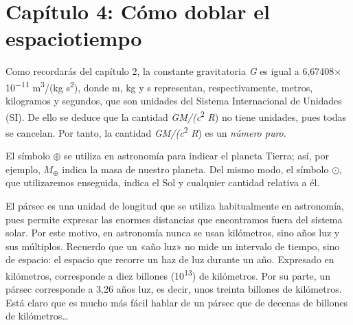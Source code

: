 \section*{Capítulo 4: Cómo doblar el espaciotiempo}
\begin{description}[style=multiline,leftmargin=2em,labelwidth=1.5em]

\item[1.]\hypertarget{note:04-01}{}Como recordarás del capítulo 2, la constante
gravitatoria \emph{G} es igual a
6,67408\(\times\)10\textsuperscript{−11} m\textsuperscript{3}/(kg
s\textsuperscript{2}), donde m, kg y s representan, respectivamente, metros,
kilogramos y segundos, que son unidades del Sistema Internacional de Unidades
(SI). De ello se deduce que la cantidad \emph{GM/(c}\textsuperscript{2} \emph{R}) no
tiene unidades, pues todas se cancelan. Por tanto, la cantidad
\emph{GM/(c}\textsuperscript{2} \emph{R}) es un \emph{número puro}.

\item[2.]\hypertarget{note:04-02}{}El símbolo \(\oplus\) se utiliza en astronomía
para indicar el planeta Tierra; así, por ejemplo, \(M_{\oplus}\) indica la masa de
nuestro planeta. Del mismo modo, el símbolo \(\odot\), que utilizaremos enseguida,
indica el Sol y cualquier cantidad relativa a él.

\item[3.]\hypertarget{note:04-03}{}El pársec es una unidad de longitud que se utiliza
habitualmente en astronomía, pues permite expresar las enormes distancias que
encontramos fuera del sistema solar. Por este motivo, en astronomía nunca se usan
kilómetros, sino años luz y sus múltiplos. Recuerdo que un «año luz» no mide un
intervalo de tiempo, sino de espacio: el espacio que recorre un haz de luz durante
un año. Expresado en kilómetros, corresponde a diez billones
(10\textsuperscript{13}) de kilómetros. Por su parte, un pársec corresponde a
3,26 años luz, es decir, unos treinta billones de kilómetros. Está claro que es
mucho más fácil hablar de un pársec que de decenas de billones de kilómetros…

\end{description}
